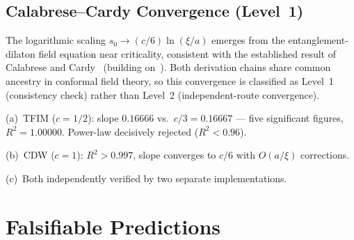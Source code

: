 \documentclass[aps,prd,twocolumn,superscriptaddress,nofootinbib,floatfix]{revtex4-2}
\newcommand{\sn}{s_0}
\begin{document}
\subsection{Calabrese--Cardy Convergence (Level~1)}

The logarithmic scaling $\sn \to (c/6)\ln(\xi/a)$ emerges from the entanglement-dilaton field equation near criticality, consistent with the established result of Calabrese and Cardy~\cite{CalabreseCardy2004} (building on~\cite{HolzheyLarsenWilczek1994}). Both derivation chains share common ancestry in conformal field theory, so this convergence is classified as Level~1 (consistency check) rather than Level~2 (independent-route convergence).

(a)~TFIM ($c = 1/2$): slope $0.16666$ vs.\ $c/3 = 0.16667$ --- five significant figures, $R^2 = 1.00000$. Power-law decisively rejected ($R^2 < 0.96$).

(b)~CDW ($c = 1$): $R^2 > 0.997$, slope converges to $c/6$ with $O(a/\xi)$ corrections.

(c)~Both independently verified by two separate implementations.

\section{Falsifiable Predictions}
\label{sec:predictions}
\end{document}
